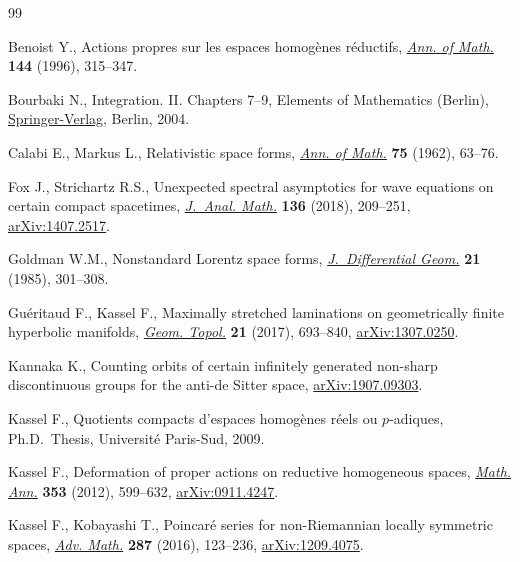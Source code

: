 \begin{thebibliography}{99}
\footnotesize\itemsep=0pt

Benoist Y., Actions propres sur les espaces homog\`enes r\'eductifs,
 \href{https://doi.org/10.2307/2118594}{\textit{Ann. of Math.}} \textbf{144} (1996), 315--347.

Bourbaki N., Integration. {II}. {C}hapters 7--9, Elements of Mathematics
 (Berlin), \href{https://doi.org/10.1007/978-3-662-07931-7}{Springer-Verlag}, Berlin, 2004.

Calabi E., Markus L., Relativistic space forms, \href{https://doi.org/10.2307/1970419}{\textit{Ann. of Math.}}
 \textbf{75} (1962), 63--76.

Fox J., Strichartz R.S., Unexpected spectral asymptotics for wave equations on
 certain compact spacetimes, \href{https://doi.org/10.1007/s11854-018-0059-2}{\textit{J.~Anal. Math.}} \textbf{136} (2018),
 209--251, \href{https://arxiv.org/abs/1407.2517}{arXiv:1407.2517}.

Goldman W.M., Nonstandard {L}orentz space forms, \href{https://doi.org/10.4310/jdg/1214439567}{\textit{J.~Differential Geom.}}
 \textbf{21} (1985), 301--308.

Gu\'eritaud F., Kassel F., Maximally stretched laminations on geometrically
 finite hyperbolic manifolds, \href{https://doi.org/10.2140/gt.2017.21.693}{\textit{Geom. Topol.}} \textbf{21} (2017),
 693--840, \href{https://arxiv.org/abs/1307.0250}{arXiv:1307.0250}.

Kannaka K., Counting orbits of certain infinitely generated non-sharp
 discontinuous groups for the anti-de {S}itter space, \href{https://arxiv.org/abs/1907.09303}{arXiv:1907.09303}.

Kassel F., Quotients compacts d'espaces homog\`enes r\'eels ou $p$-adiques,
 Ph.D.~Thesis, {U}niversit\'e Paris-Sud, 2009.

Kassel F., Deformation of proper actions on reductive homogeneous spaces,
 \href{https://doi.org/10.1007/s00208-011-0672-1}{\textit{Math. Ann.}} \textbf{353} (2012), 599--632, \href{https://arxiv.org/abs/0911.4247}{arXiv:0911.4247}.

Kassel F., Kobayashi T., Poincar\'e series for non-{R}iemannian locally
 symmetric spaces, \href{https://doi.org/10.1016/j.aim.2015.08.029}{\textit{Adv. Math.}} \textbf{287} (2016), 123--236,
 \href{https://arxiv.org/abs/1209.4075}{arXiv:1209.4075}.


\end{thebibliography}
